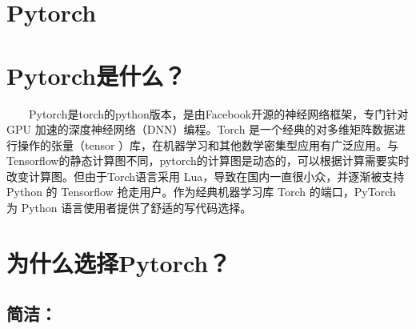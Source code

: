 \begin{Shaded}
\begin{Highlighting}[]
\OperatorTok{=} \NormalTok{(np.prod(pool5.get_shape().as_list()[}\NormalTok{:]))}
\OperatorTok{=}\NormalTok{ tf.reshape(pool5,[}\OperatorTok{-}\NormalTok{,pool5_flatten_dims])}
    
\OperatorTok{=}\NormalTok{, }\NormalTok{)}
\OperatorTok{=}\NormalTok{, }\NormalTok{, }\NormalTok{)}
\OperatorTok{=}\NormalTok{, }\NormalTok{, }\NormalTok{)}
    
    
\end{Highlighting}
\end{Shaded}

\section{Pytorch}\label{pytorch}

\section{ Pytorch是什么？}\label{pytorchux662fux4ec0ux4e48}

  Pytorch是torch的python版本，是由Facebook开源的神经网络框架，专门针对
GPU 加速的深度神经网络（DNN）编程。Torch
是一个经典的对多维矩阵数据进行操作的张量（tensor
）库，在机器学习和其他数学密集型应用有广泛应用。与Tensorflow的静态计算图不同，pytorch的计算图是动态的，可以根据计算需要实时改变计算图。但由于Torch语言采用
Lua，导致在国内一直很小众，并逐渐被支持 Python 的 Tensorflow
抢走用户。作为经典机器学习库 Torch 的端口，PyTorch 为 Python
语言使用者提供了舒适的写代码选择。

\section{ 为什么选择Pytorch？}\label{ux4e3aux4ec0ux4e48ux9009ux62e9-pytorch}

\subsection{简洁：}\label{ux7b80ux6d01}

